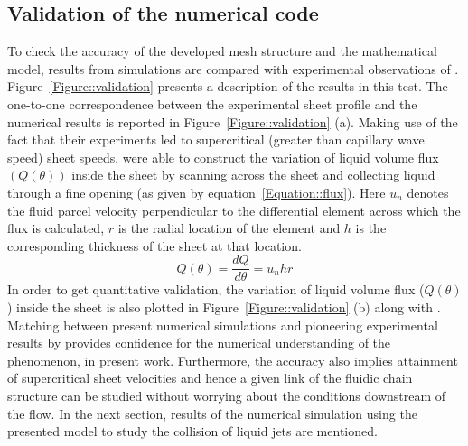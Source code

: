 \subsection{Validation of the numerical code}
To check the accuracy of the developed mesh structure and the mathematical model, results from simulations are compared with experimental observations of \citet{bush2004collision}. Figure~\ref{Figure::validation} presents a description of the results in this test. The one-to-one correspondence between the experimental sheet profile \citep{bush2004collision} and the numerical results is reported in Figure~\ref{Figure::validation} (a). Making use of the fact that their experiments led to supercritical (greater than capillary wave speed) sheet speeds, \citet{bush2004collision} were able to construct the variation of liquid volume flux $\left(Q(\theta)\right)$ inside the sheet by scanning across the sheet and collecting liquid through a fine opening (as given by equation~\ref{Equation::flux}). Here $u_n$ denotes the fluid parcel velocity perpendicular to the differential element across which the flux is calculated, $r$ is the radial location of the element and $h$ is the corresponding thickness of the sheet at that location. 
\begin{equation}\label{Equation::flux}
Q(\theta) = \frac{dQ}{d\theta} = u_nhr
\end{equation}
In order to get quantitative validation, the variation of liquid volume flux ($Q(\theta)$) inside the sheet is also plotted in Figure~\ref{Figure::validation} (b) along with \citet{bush2004collision}. Matching between present numerical simulations and pioneering experimental results by \citet{bush2004collision} provides confidence for the numerical understanding of the phenomenon, in present work. Furthermore, the accuracy also implies attainment of supercritical sheet velocities and hence a given link of the fluidic chain structure can be studied without worrying about the conditions downstream of the flow. In the next section, results of the numerical simulation using the presented model to study the collision of liquid jets are mentioned.
